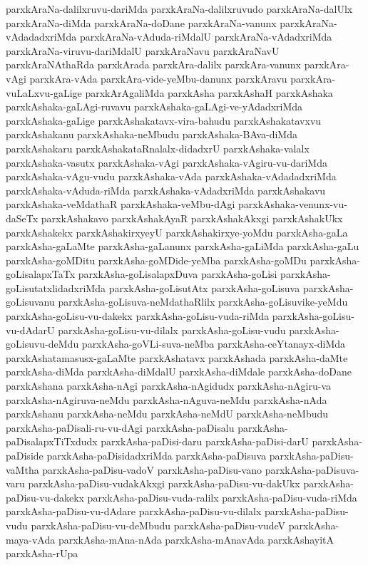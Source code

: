 {parxkAraNa-dalilxruvu-dariMda
parxkAraNa-dalilxruvudo
parxkAraNa-dalUlx
parxkAraNa-diMda
parxkAraNa-doDane
parxkAraNa-vanunx
parxkAraNa-vAdadadxriMda
parxkAraNa-vAduda-riMdalU
parxkAraNa-vAdadxriMda
parxkAraNa-viruvu-dariMdalU
parxkAraNavu
parxkAraNavU
parxkAraNAthaRda
parxkArada
parxkAra-dalilx
parxkAra-vanunx
parxkAra-vAgi
parxkAra-vAda
parxkAra-vide-yeMbu-danunx
parxkAravu
parxkAra-vuLaLxvu-gaLige
parxkArAgaliMda
parxkAsha
parxkAshaH
parxkAshaka
parxkAshaka-gaLAgi-ruvavu
parxkAshaka-gaLAgi-ve-yAdadxriMda
parxkAshaka-gaLige
parxkAshakatavx-vira-bahudu
parxkAshakatavxvu
parxkAshakanu
parxkAshaka-neMbudu
parxkAshaka-BAva-diMda
parxkAshakaru
parxkAshakataRnalalx-didadxrU
parxkAshaka-valalx
parxkAshaka-vasutx
parxkAshaka-vAgi
parxkAshaka-vAgiru-vu-dariMda
parxkAshaka-vAgu-vudu
parxkAshaka-vAda
parxkAshaka-vAdadadxriMda
parxkAshaka-vAduda-riMda
parxkAshaka-vAdadxriMda
parxkAshakavu
parxkAshaka-veMdathaR
parxkAshaka-veMbu-dAgi
parxkAshaka-venunx-vu-daSeTx
parxkAshakavo
parxkAshakAyaR
parxkAshakAkxgi
parxkAshakUkx
parxkAshakekx
parxkAshakirxyeyU
parxkAshakirxye-yoMdu
parxkAsha-gaLa
parxkAsha-gaLaMte
parxkAsha-gaLanunx
parxkAsha-gaLiMda
parxkAsha-gaLu
parxkAsha-goMDitu
parxkAsha-goMDide-yeMba
parxkAsha-goMDu
parxkAsha-goLisalapxTaTx
parxkAsha-goLisalapxDuva
parxkAsha-goLisi
parxkAsha-goLisutatxlidadxriMda
parxkAsha-goLisutAtx
parxkAsha-goLisuva
parxkAsha-goLisuvanu
parxkAsha-goLisuva-neMdathaRlilx
parxkAsha-goLisuvike-yeMdu
parxkAsha-goLisu-vu-dakekx
parxkAsha-goLisu-vuda-riMda
parxkAsha-goLisu-vu-dAdarU
parxkAsha-goLisu-vu-dilalx
parxkAsha-goLisu-vudu
parxkAsha-goLisuvu-deMdu
parxkAsha-goVLi-suva-neMba
parxkAsha-ceYtanayx-diMda
parxkAshatamasusx-gaLaMte
parxkAshatavx
parxkAshada
parxkAsha-daMte
parxkAsha-diMda
parxkAsha-diMdalU
parxkAsha-diMdale
parxkAsha-doDane
parxkAshana
parxkAsha-nAgi
parxkAsha-nAgidudx
parxkAsha-nAgiru-va
parxkAsha-nAgiruva-neMdu
parxkAsha-nAguva-neMdu
parxkAsha-nAda
parxkAshanu
parxkAsha-neMdu
parxkAsha-neMdU
parxkAsha-neMbudu
parxkAsha-paDisali-ru-vu-dAgi
parxkAsha-paDisalu
parxkAsha-paDisalapxTiTxdudx
parxkAsha-paDisi-daru
parxkAsha-paDisi-darU
parxkAsha-paDiside
parxkAsha-paDisidadxriMda
parxkAsha-paDisuva
parxkAsha-paDisu-vaMtha
parxkAsha-paDisu-vadoV
parxkAsha-paDisu-vano
parxkAsha-paDisuva-varu
parxkAsha-paDisu-vudakAkxgi
parxkAsha-paDisu-vu-dakUkx
parxkAsha-paDisu-vu-dakekx
parxkAsha-paDisu-vuda-ralilx
parxkAsha-paDisu-vuda-riMda
parxkAsha-paDisu-vu-dAdare
parxkAsha-paDisu-vu-dilalx
parxkAsha-paDisu-vudu
parxkAsha-paDisu-vu-deMbudu
parxkAsha-paDisu-vudeV
parxkAsha-maya-vAda
parxkAsha-mAna-nAda
parxkAsha-mAnavAda
parxkAshayitA
parxkAsha-rUpa
}
